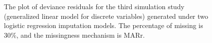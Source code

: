 \documentclass[12pt, fullpage, a4paper]{article}
\begin{document}
\begin{figure}[ht!]
	\begin{center}
	\end{center}
	\caption{The plot of deviance residuals for the third simulation study (generalized linear model for discrete variables) generated under two logistic regression imputation models. The percentage of missing is 30\%, and the missingness mechanism is MARr.}
	\label{fig6_8}
\end{figure}
\end{document}
